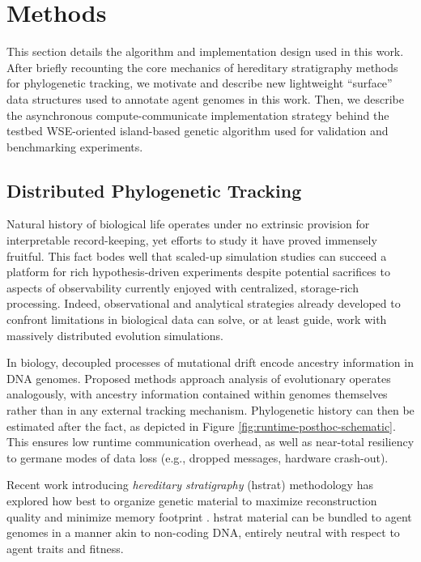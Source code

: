 \section{Methods} \label{sec:methods}

This section details the algorithm and implementation design used in this work.
After briefly recounting the core mechanics of hereditary stratigraphy methods for phylogenetic tracking, we motivate and describe new lightweight ``surface'' data structures used to annotate agent genomes in this work.
Then, we describe the asynchronous compute-communicate implementation strategy behind the testbed WSE-oriented island-based genetic algorithm used for validation and benchmarking experiments.



\subsection{Distributed Phylogenetic Tracking}

Natural history of biological life operates under no extrinsic provision for interpretable record-keeping, yet efforts to study it have proved immensely fruitful.
This fact bodes well that scaled-up simulation studies can succeed a platform for rich hypothesis-driven experiments despite potential sacrifices to aspects of observability currently enjoyed with centralized, storage-rich processing.
Indeed, observational and analytical strategies already developed to confront limitations in biological data can solve, or at least guide, work with massively distributed evolution simulations.

In biology, decoupled processes of mutational drift encode ancestry information in DNA genomes.
Proposed methods approach analysis of evolutionary operates analogously, with ancestry information contained within genomes themselves rather than in any external tracking mechanism.
Phylogenetic history can then be estimated after the fact, as depicted in Figure \ref{fig:runtime-posthoc-schematic}.
This ensures low runtime communication overhead, as well as near-total resiliency to germane modes of data loss (e.g., dropped messages, hardware crash-out).

Recent work introducing \textit{hereditary stratigraphy} (hstrat) methodology has explored how best to organize genetic material to maximize reconstruction quality and minimize memory footprint \citep{moreno2022hstrat, moreno2022hereditary}.
hstrat material can be bundled to agent genomes in a manner akin to non-coding DNA, entirely neutral with respect to agent traits and fitness.


